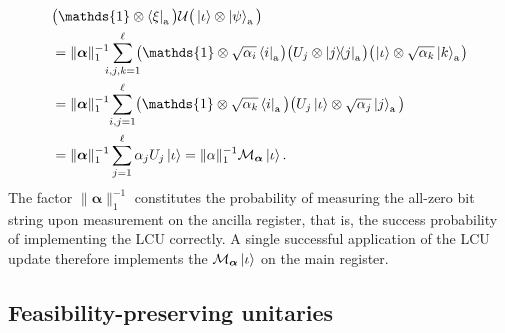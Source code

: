 \documentclass[10pt,conference]{IEEEtran}
\DeclareMathOperator{\ancilla}{a}     %
\newcommand*{\one}{\mathds{1}}        %
\begin{document}
\begin{align*}
    &\big(\one \otimes \bra{\xi}_{\ancilla}\big) \mathcal{U} \big(\ket{\iota} \otimes \ket{\psi}_{\ancilla}\big) \\
    &= \lVert\bm{\alpha}\rVert_{1}^{-1}\hspace*{-5pt} \sum_{i, j, k = 1}^{\ell}\hspace*{-5pt} \big(\one \otimes \sqrt{\alpha_{i}} \bra{i}_{\ancilla}\hspace*{-1pt}\big) \big(U_{j} \otimes \ketbra{j}{j}_{\ancilla}\hspace*{-1pt}\big) \big(\hspace*{-1pt}\ket{\iota} \otimes \sqrt{\alpha_{k}} \ket{k}_{\ancilla}\hspace*{-1pt}\big) \\
    &= \lVert\bm{\alpha}\rVert_{1}^{-1}\hspace*{-2pt} \sum_{i, j = 1}^{\ell}\hspace*{-2pt} \big(\one \otimes \sqrt{\alpha_{k}} \bra{i}_{\ancilla}\big) \big(U_{j} \ket{\iota} \otimes \sqrt{\alpha_{j}} \ket{j}_{\ancilla}\big) \\
    &= \lVert\bm{\alpha}\rVert_{1}^{-1} \sum_{j = 1}^{\ell} \alpha_{j} U_{j} \ket{\iota} = \lVert\alpha\rVert_{1}^{-1} \mathcal{M}_{\bm{\alpha}} \ket{\iota}.
\end{align*}
The factor $\lVert\bm{\alpha}\rVert_{1}^{-1}$ constitutes the probability of measuring the all-zero bit string upon measurement on the ancilla register, that is, the success probability of implementing the LCU correctly.
A single successful application of the LCU update therefore implements the $\mathcal{M}_{\bm{\alpha}} \ket{\iota}$ on the main register.


\subsection{\label{subsection:FeasibilityPreservingUnitaries}Feasibility-preserving unitaries}
\end{document}
